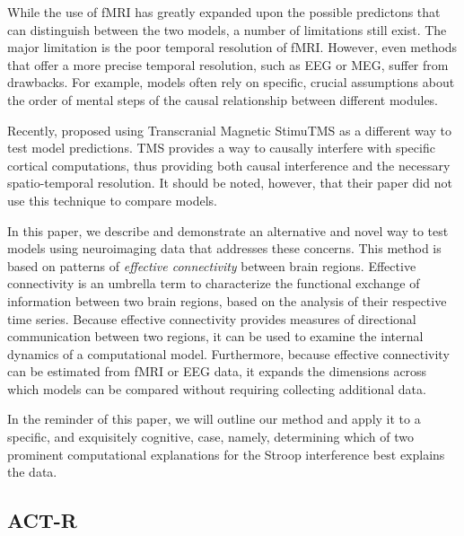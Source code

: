 \documentclass[10pt,letterpaper]{article}
\begin{document}
While the use of fMRI has greatly expanded upon the possible predictons that can distinguish between the two models, a number of limitations still exist. The major limitation is the poor temporal resolution of fMRI.  However, even methods that offer a more precise temporal resolution, such as EEG or MEG, suffer from drawbacks. For example, models often rely on specific, crucial assumptions about the order of mental steps of the causal relationship between different modules. 

Recently,  proposed using Transcranial Magnetic StimuTMS as a different way to test model predictions. TMS provides a way to causally interfere with specific cortical computations, thus providing both causal interference and the necessary spatio-temporal resolution. It should be noted, however, that their paper did not use this technique to compare models. 

In this paper, we describe and demonstrate an alternative and novel way to test models using neuroimaging data that addresses these concerns. This method is based on patterns of {\it effective connectivity} between brain regions. Effective connectivity is an umbrella term to characterize the functional exchange of information between two brain regions, based on the analysis of their respective time series. Because effective connectivity provides measures of directional communication between two regions, it can be used to examine the internal dynamics of a computational model.  Furthermore, because effective connectivity can be estimated from fMRI or EEG data, it expands the dimensions across which models can be compared without requiring collecting additional data.

In the reminder of this paper, we will outline our method and apply it to a specific, and exquisitely cognitive, case, namely, determining which of two prominent computational explanations for the Stroop interference best explains the data.    

\subsection{ACT-R}
\end{document}
